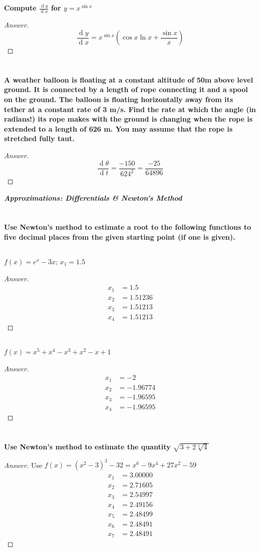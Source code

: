 \documentclass[english,fleqn]{article}
\renewcommand{\d}[1]{\ensuremath{\operatorname{d}\!{#1}}}
\newcommand{\dydx}[2]{\frac{\d #1}{\d #2}}
\newcommand{\prob}[1]{\setcounter{section}{#1-1}\section{}}
\newcommand{\prt}[1]{\setcounter{subsection}{#1-1}\subsection{}}
\theoremstyle{remark}
\theoremstyle{definition}
\begin{document}
	\prob{3}
\textbf{Compute $\dydx{y}{x}$ for $y=x^{\sin{x}}$}%
\begin{proof}[Answer]
	\[\dydx{y}{x}=x^{\sin x}\left(\cos x \ln x +\frac{\sin x}{x}\right)\]
\end{proof}
\prob{4} \textbf{A weather balloon is floating at a constant altitude of 50m above level ground. It is connected by a length of rope connecting it and a spool on the ground. The balloon is floating horizontally away from its tether at a constant rate of 3 m/s. Find the rate at which the angle (in radians!) its rope makes with the ground is changing when the rope is extended to a length of 626 m. You may assume that the rope is stretched fully taut.}
\begin{proof}[Answer]
\[\dydx{\theta}{t}=\frac{-150}{624^2}=\frac{-25}{64896}\]
\end{proof}
\newpage
		\begin{center}{\Large\textbf{\emph{Approximations: Differentials \& Newton's Method}}}\end{center}
		\prob{5} \textbf{Use Newton's method to estimate a root to the following functions to five decimal places from the given starting point (if one is given).}
		\prt{1} $f(x)=e^x-3x$; $x_1=1.5$
		\begin{proof}[Answer]
				\begin{align*}
	x_1&=	1.5\\x_2&= 1.51236\\x_3&= 1.51213\\ x_4&=1.51213
	\end{align*}
			\end{proof}
		\prt{2} $f(x)=x^5+x^4-x^3+x^2-x+1$%
		\begin{proof}[Answer]
			\begin{align*}
			x_1&=	-2\\x_2&= -1.96774\\x_3&= -1.96595\\ x_4&=-1.96595
			\end{align*}
		\end{proof}
		\prob{6} \textbf{Use Newton's method to estimate the quantity $\sqrt{3+2\sqrt[3]{4}}$}%
		\begin{proof}[Answer]
			Use $f(x)=(x^2 - 3)^3 - 32=x^6-9 x^4+27 x^2-59$\begin{align*}
				x_1&=3.00000\\x_2&= 2.71605\\x_3&= 2.54997\\x_4&= 2.49156\\x_5&= 2.48499\\x_6&= 2.48491\\x_7&= 2.48491
			\end{align*}
		\end{proof}
\end{document}
